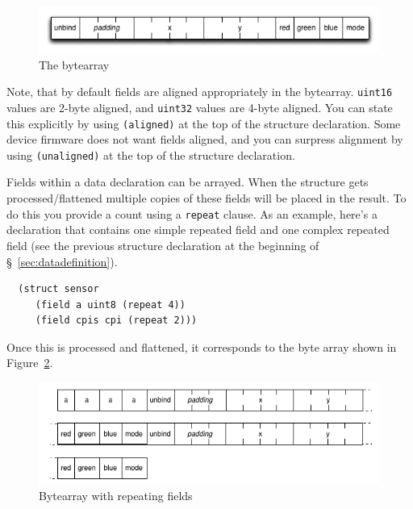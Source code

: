 \documentclass[12pt]{article}
\begin{document}
\begin{figure}[htbp] %
   \centering
   \includegraphics[width=6in]{bytearray.png} 
\caption{The bytearray}
\label{fig:bytearray}
\end{figure}

Note, that by default fields are aligned appropriately in the
bytearray. \verb|uint16| values are 2-byte aligned, and \verb|uint32|
values are 4-byte aligned. You can state this explicitly by using
\verb|(aligned)| at the top of the structure declaration. Some device
firmware does not want fields aligned, and you can surpress alignment
by using \verb|(unaligned)| at the top of the structure declaration. 

Fields within a data declaration can be arrayed. When the structure
gets processed/flattened multiple copies of these fields will be
placed in the result. To do this you provide a count using a
\verb|repeat| clause. As an example, here's a declaration that 
contains one simple repeated field and one complex repeated field 
(see the previous structure declaration at the beginning of
\S~\ref{sec:datadefinition}). 

\begin{verbatim}
  (struct sensor
     (field a uint8 (repeat 4))
     (field cpis cpi (repeat 2)))
\end{verbatim}

Once this is processed and flattened, it corresponds to the byte array
shown in Figure~\ref{fig:repeatingbytearray}.

\begin{figure}[htbp] %
   \centering
   \includegraphics[width=6in]{repeated_bytearray.png} 
\caption{Bytearray with repeating fields}
\label{fig:repeatingbytearray}
\end{figure}
\end{document}
